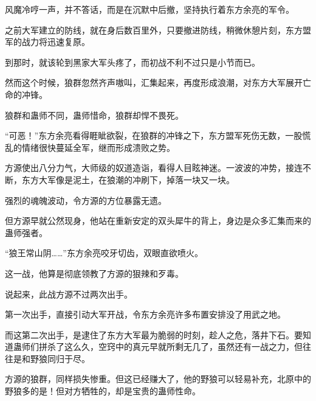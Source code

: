 \begin{this_body}
风魔冷哼一声，并不答话，而是在沉默中后撤，坚持执行着东方余亮的军令。

之前大军建立的防线，就在身后数百里外，只要撤进防线，稍微休憩片刻，东方盟军的战力将迅速复原。

到那时，就该轮到黑家大军头疼了，而初战不利不过只是小节而已。

然而这个时候，狼群忽然齐声嗷叫，汇集起来，再度形成浪潮，对东方大军展开亡命的冲锋。

狼群和蛊师不同，蛊师惜命，狼群却悍不畏死。

“可恶！”东方余亮看得睚眦欲裂，在狼群的冲锋之下，东方盟军死伤无数，一股慌乱的情绪很快蔓延全军，继而形成溃败之势。

方源使出八分力气，大师级的奴道造诣，看得人目眩神迷。一波波的冲势，接连不断，东方大军像是泥土，在狼潮的冲刷下，掉落一块又一块。

强烈的魂魄波动，令方源的方位暴露无遗。

但方源早就公然现身，他站在重新安定的双头犀牛的背上，身边是众多汇集而来的蛊师强者。

“狼王常山阴……”东方余亮咬牙切齿，双眼直欲喷火。

这一战，他算是彻底领教了方源的狠辣和歹毒。

说起来，此战方源不过两次出手。

第一次出手，直接引动大军开战，令东方余亮许多布置安排没了用武之地。

而这第二次出手，是逮住了东方大军最为脆弱的时刻，趁人之危，落井下石。要知道蛊师们拼杀了这么久，空窍中的真元早就所剩无几了，虽然还有一战之力，但往往是和野狼同归于尽。

方源的狼群，同样损失惨重。但这已经赚大了，他的野狼可以轻易补充，北原中的野狼多的是！但对方牺牲的，却是宝贵的蛊师性命。

\end{this_body}

